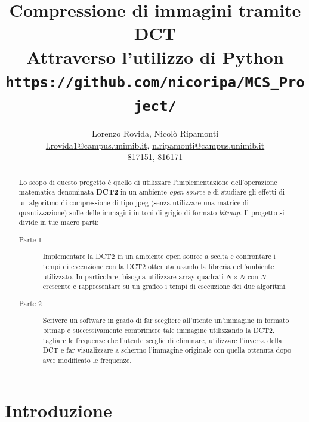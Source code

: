 \documentclass[preprint,12pt]{elsarticle}
\begin{document}
		
\begin{frontmatter}

\title{Compressione di immagini tramite DCT\\
\large{Attraverso l'utilizzo di Python}
\vspace{5mm}\\ \normalsize{\texttt{https://github.com/nicoripa/MCS\_Project/}}}

\author{Lorenzo Rovida, Nicolò Ripamonti\\
	\small{ \href{mailto:l.rovida1@campus.unimib.it}{l.rovida1@campus.unimib.it},  \href{mailto:n.ripamonti@campus.unimib.it}{n.ripamonti@campus.unimib.it}\\817151, 816171}}

\address{Dipartimento di Informatica, Sistemi e Comunicazione, Universitá degli Studi di Milano-Bicocca, Milano, Italia}


\begin{abstract}
Lo scopo di questo progetto è quello di utilizzare l’implementazione dell'operazione matematica denominata \textbf{DCT2} in un ambiente \textit{open source} e di studiare gli effetti di un algoritmo di compressione di tipo jpeg (senza utilizzare una matrice di quantizzazione) sulle delle immagini in toni di grigio di formato \textit{bitmap}.
Il progetto si divide in tue macro parti:
\begin{description}
\item[Parte 1] Implementare la DCT2  in un ambiente open source a scelta e confrontare i tempi di esecuzione con la DCT2 ottenuta usando la libreria dell’ambiente utilizzato. In particolare, bisogna utilizzare array quadrati $N \times N$ con $N$ crescente e rappresentare su un grafico i tempi di esecuzione dei due algoritmi.
\item[Parte 2] Scrivere un software in grado di far scegliere all'utente un'immagine in formato bitmap e successivamente comprimere tale immagine utilizzando la DCT2, tagliare le frequenze che l'utente sceglie di eliminare, utilizzare l'inversa della DCT e far visualizzare a schermo l'immagine originale con quella ottenuta dopo aver modificato le frequenze.
\end{description}
\end{abstract}

\end{frontmatter}

\newpage

\section{Introduzione}
\end{document}
